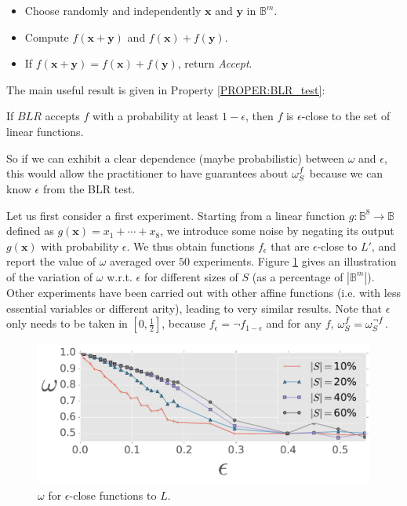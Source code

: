 \begin{itemize}
\item Choose randomly and independently $\mathbf{x}$ and $\mathbf{y}$ in
  $\mathbb{B}^m$.
\item Compute $f(\mathbf{x}+\mathbf{y})$ and $f(\mathbf{x}) + f(\mathbf{y})$.
\item If $f(\mathbf{x}+\mathbf{y}) = f(\mathbf{x}) + f(\mathbf{y})$, return
  \textit{Accept}.
\end{itemize}

The main useful result is given in Property \ref{PROPER:BLR_test}:
\begin{property}
  \label{PROPRE:BLR_test}
  If $BLR$ accepts $f$ with a probability at least $1-\epsilon$, then $f$ is
  $\epsilon$-close to the set of linear functions.
\end{property}

So if we can exhibit a clear dependence (maybe probabilistic) between $\omega$
and $\epsilon$, this would allow the practitioner to have guarantees about
$\omega_{S}^{f}$ because we can know $\epsilon$ from the BLR test.

Let us first consider a first experiment. Starting from a linear function $g
\colon \mathbb{B}^8 \to \mathbb{B}$ defined as  $g(\mathbf{x}) = x_1 + \cdots +
x_8$, we introduce some noise by negating its output $g(\mathbf{x})$ with
probability $\epsilon$. We thus obtain functions $f_{\epsilon}$ that are
$\epsilon$-close to $L'$, and report the value of $\omega$ averaged over $50$
experiments.  Figure \ref{omega_vs_eps} gives an
illustration of the variation of $\omega$ w.r.t.  $\epsilon$ for different
sizes of $S$ (as a percentage of $|\mathbb{B}^m|$).  Other experiments have
been carried out with other affine functions (i.e.  with less essential
variables or different arity), leading to very similar results.  Note that
$\epsilon$ only needs to be taken in $[0, \frac{1}{2}]$, because $f_\epsilon =
\neg f_{1 - \epsilon}$ and for any $f$, $\omega_{S}^{f} = \omega_S^{\neg f}$.

\begin{figure}
\begin{center}
\includegraphics[scale=0.6]{figures/omega_vs_eps_dim8_nexp50_std_nEss8.pdf}
  \caption{$\omega$ for $\epsilon$-close functions to $L$.}
\label{omega_vs_eps}
\end{center}
\end{figure}

